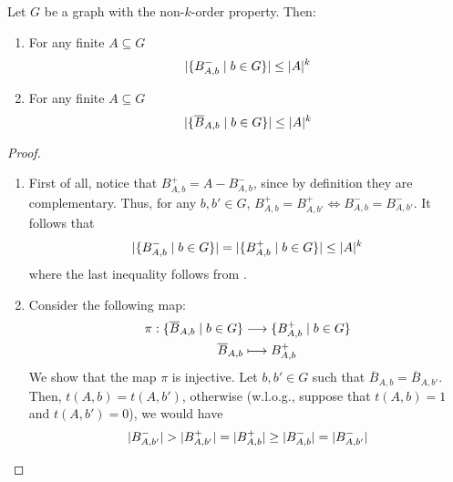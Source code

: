     \begin{corollary}[Claim 2.6.1] \label{cor:k_order_propery_bounds_BAbs}
        Let $G$ be a graph with the non-$k$-order property.
        Then:
        \begin{enumerate}
            \item\label{itm:k_order_propery_bounds_BAbs.1} For any finite $A \subseteq G$
                \[
                    | \{ B^-_{A,b} \mid b \in G \} |
                        \leq |A|^k
                \]
            \item\label{itm:k_order_propery_bounds_BAbs.2} For any finite $A \subseteq G$
                \[
                    | \{ \overline{B}_{A,b} \mid b \in G \} |
                        \leq |A|^k
                \]
        \end{enumerate}
        \begin{proof}
        \begin{enumerate}
            \item First of all, notice that $B^+_{A,b} = A - B^-_{A,b}$, since by definition they are complementary.
                Thus, for any $b, b' \in G$, $B^+_{A,b} = B^+_{A,b'} \Leftrightarrow B^-_{A,b} = B^-_{A,b'}$.
                It follows that
                \[
                    | \{ B^-_{A,b} \mid b \in G \} | =
                    | \{ B^+_{A,b} \mid b \in G \} | \leq |A|^k
                \]
                where the last inequality follows from .
            \item Consider the following map:
                \begin{align*}
                    \pi: \{ \overline{B}_{A,b} \mid b \in G \} & \longrightarrow \{ B^+_{A,b} \mid b \in G \} \\
                                                       \overline{B}_{A,b} & \longmapsto B^+_{A,b}
                \end{align*}
                We show that the map $\pi$ is injective.
                Let $b,b' \in G$ such that $\overline{B}_{A,b} = \overline{B}_{A,b'}$.
                Then, $t(A,b) = t(A,b')$, otherwise (w.l.o.g., suppose that $t(A,b) = 1$ and $t(A,b') = 0$), we would have
                \[
                    | B^-_{A,b'} | > | B^+_{A,b'} | = | B^+_{A,b} | \geq
                        | B^-_{A,b} | = | B^-_{A,b'} |
                \]

\end{enumerate}
\end{proof}
\end{corollary}
